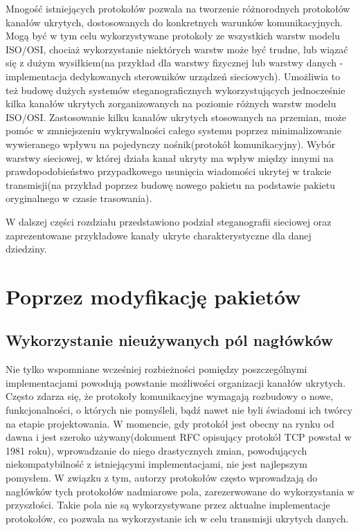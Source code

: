\documentclass[a4paper, twoside]{report}
\begin{document}
    Mnogość istniejących protokołów pozwala na tworzenie różnorodnych protokołów
    kanałów ukrytych, dostosowanych do konkretnych warunków komunikacyjnych.
    Mogą być w tym celu wykorzystywane protokoły ze wszystkich warstw modelu
    ISO/OSI, chociaż wykorzystanie niektórych warstw może być trudne, lub wiązać
    się z dużym wysiłkiem(na przykład dla warstwy fizycznej lub warstwy danych -
    implementacja dedykowanych sterowników urządzeń sieciowych). Umożliwia to
    też budowę dużych systemów steganograficznych wykorzystujących jednocześnie
    kilka kanałów ukrytych zorganizowanych na poziomie różnych warstw modelu ISO/OSI.
    Zastosowanie kilku kanałów ukrytych stosowanych na przemian, może pomóc w zmniejszeniu
    wykrywalności całego systemu poprzez minimalizowanie wywieranego wpływu na pojedynczy
    nośnik(protokół komunikacyjny). Wybór warstwy sieciowej, w której działa kanał ukryty
    ma wpływ między innymi na prawdopodobieństwo przypadkowego usunięcia wiadomości
    ukrytej w trakcie transmisji(na przykład poprzez budowę nowego pakietu na podstawie
    pakietu oryginalnego w czasie trasowania).

    W dalszej części rozdziału przedstawiono podział steganografii sieciowej
    oraz zaprezentowane przykładowe kanały ukryte charakterystyczne dla danej
    dziedziny.
    \section{Poprzez modyfikację pakietów}
        \subsection{Wykorzystanie nieużywanych pól nagłówków}
        Nie tylko wspomniane wcześniej rozbieżności pomiędzy poszczególnymi
        implementacjami powodują powstanie możliwości organizacji kanałów ukrytych.
        Często zdarza się, że protokoły komunikacyjne wymagają rozbudowy o nowe,
        funkcjonalności, o których nie pomyśleli, bądź nawet nie byli świadomi
        ich twórcy na etapie projektowania. W momencie, gdy protokół jest obecny
        na rynku od dawna i jest szeroko używany(dokument RFC opisujący protokół TCP
        powstał w 1981 roku\cite{TCPRFC}), wprowadzanie do niego drastycznych zmian,
        powodujących niekompatybilność z istniejącymi implementacjami, nie jest
        najlepszym pomysłem. W związku z tym, autorzy protokołów często wprowadzają
        do nagłówków tych protokołów nadmiarowe pola, zarezerwowane do wykorzystania
        w przyszłości. Takie pola nie są wykorzystywane przez aktualne implementacje
        protokołów, co pozwala na wykorzystanie ich w celu transmisji ukrytych danych.
\end{document}
